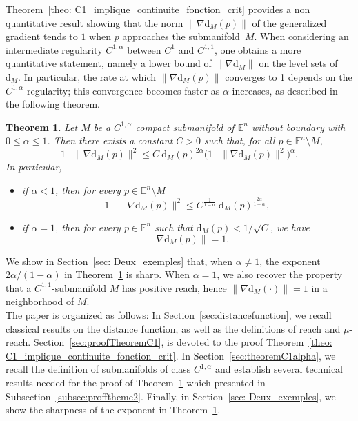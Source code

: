 \documentclass[11pt,reqno,a4paper]{article}%
\newtheorem{theorem}{Theorem}[section]
\theoremstyle{definition}
\theoremstyle{remark}
\renewcommand{\leq}{\leqslant}
\renewcommand{\d}{\mathrm{d}}
\newcommand{\E}{\mathbb{E}}
\renewcommand{\d}{\mathrm{d}}
\begin{document}
\noindent 
Theorem~\ref{theo: C1_implique_continuite_fonction_crit} provides a non quantitative result showing that the norm $\|\nabla \d_M(p)\|$ of the generalized gradient tends to $1$ when $p$ approaches the submanifold~$M$. When considering an intermediate regularity $C^{1,\alpha}$ between $C^1$ and $C^{1,1}$, one obtains a more quantitative statement, namely a lower bound of $\|\nabla \d_M\|$ on the level sets of $\d_M$. In particular, the rate at which $\|\nabla \d_M(p)\|$ converges to 1 depends on the $C^{1,\alpha}$ regularity;  this convergence becomes faster as $\alpha$ increases, as described in the following theorem.

\begin{theorem} \label{theo: majoration_fonction_critique}
Let $M$ be a $C^{1,\alpha}$ compact submanifold of $\E^n$ without boundary with $0\leq \alpha \leq 1$.
Then there exists a constant $C > 0$ such that, for all $p \in \E^n \setminus M$,
$$  1 - \| \nabla \d_M(p) \|^2  \leq C ~\d_M(p)^{2 \alpha} \Big( 1 - \| \nabla \d_M(p) \|^2 \Big)^{\alpha}.$$
In particular, 
\begin{itemize} 
\item if $\alpha <1$, then for every $p \in \E^n \setminus M$ 
$$
 1 - \| \nabla \d_M(p) \|^2  \leq C^{\frac{1}{1-\alpha}} ~ \d_M(p)^{\frac{2 \alpha}{1- \alpha}},
$$
\item if $\alpha=1$, then for every $p\in \E^n$ such that $\d_M(p)< 1/\sqrt{C}$, we have 
$$\|\nabla\d_M(p)\|=1.$$
\end{itemize}
\end{theorem}
 We show in Section~\ref{sec: Deux_exemples} that, when $\alpha\neq 1$, the exponent $2\alpha/(1-\alpha)$ in Theorem~\ref{theo: majoration_fonction_critique} is sharp. When $\alpha=1$, we also recover the property that a $C^{1,1}$-submanifold $M$ has positive reach, hence $\|\nabla\d_M(\cdot)\|=1$ in a neighborhood of $M$.\\


The paper is organized as follows: In Section~\ref{sec:distancefunction}, we recall classical results on the distance function, as well as the definitions of reach and $\mu$-reach. Section~\ref{sec:proofTheoremC1}, is devoted to the proof Theorem~\ref{theo: C1_implique_continuite_fonction_crit}. In Section~\ref{sec:theoremC1alpha}, we recall the definition of submanifolds of class $C^{1,\alpha}$ and establish several technical results needed for the proof of Theorem~\ref{theo: majoration_fonction_critique} which presented in Subsection~\ref{subsec:profftheme2}. Finally, in Section~\ref{sec: Deux_exemples}, we show the sharpness of the exponent in Theorem~\ref{theo: majoration_fonction_critique}.
\end{document}
